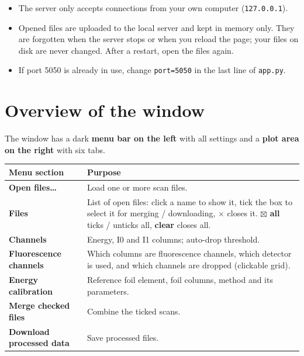 \documentclass[11pt,a4paper]{article}
\newcommand{\ui}[1]{\textsf{\textbf{#1}}}          %
\newcommand{\file}[1]{\texttt{#1}}
\begin{document}
\begin{note}
\begin{itemize}[leftmargin=*]
  \item The server only accepts connections from your own computer (\texttt{127.0.0.1}).
  \item Opened files are uploaded to the local server and kept in memory only. They are
        forgotten when the server stops or when you reload the page; your files on disk are never
        changed. After a restart, open the files again.
  \item If port 5050 is already in use, change \texttt{port=5050} in the last line of
        \file{app.py}.
\end{itemize}
\end{note}

\section{Overview of the window}
The window has a dark \textbf{menu bar on the left} with all settings and a
\textbf{plot area on the right} with six tabs.

\begin{center}
\begin{tabularx}{\linewidth}{@{}lX@{}}
\toprule
Menu section & Purpose \\
\midrule
\ui{Open files\ldots}        & Load one or more scan files. \\
\ui{Files}                   & List of open files: click a name to show it, tick the box to select it for
                               merging / downloading, $\times$ closes it. \ui{$\boxtimes$ all} ticks / unticks all,
                               \ui{clear} closes all. \\
\ui{Channels}                & Energy, I0 and I1 columns; auto-drop threshold. \\
\ui{Fluorescence channels}   & Which columns are fluorescence channels, which detector is used, and which channels
                               are dropped (clickable grid). \\
\ui{Energy calibration}      & Reference foil element, foil columns, method and its parameters. \\
\ui{Merge checked files}     & Combine the ticked scans. \\
\ui{Download processed data} & Save processed files. \\
\bottomrule
\end{tabularx}
\end{center}
\end{document}
